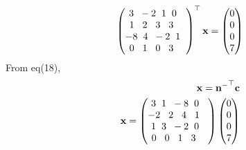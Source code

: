 \documentclass[10pt,a4paper]{report}
\newcommand{\myvec}[1]{\ensuremath{\begin{pmatrix}#1\end{pmatrix}}}
\let\vec\mathbf
\let\vec\mathbf
\begin{document}
\begin{multicols}{2}
\begin{align} 
	\myvec{3 \hspace{2mm} -2 \hspace{2mm} 1 \hspace{2mm} 0 \hspace{2mm}\\
	1 \hspace{3mm} 2 \hspace{3mm} 3 \hspace{3mm} 3 \hspace{3mm}\\
	-8 \hspace{2mm} 4 \hspace{2mm} -2 \hspace{2mm} 1 \hspace{2mm}\\
	0 \hspace{3mm} 1 \hspace{3mm} 0 \hspace{3mm} 3 \hspace{3mm}
	}^\top \vec{x} = \myvec{0\\0\\0\\7}
\end{align}
From eq(18),\\
\begin{align}
\vec{x} = \vec{n^-}^\top \vec{c}\\
\vec{x} = \myvec{3 \hspace{2mm} 1 \hspace{2mm} -8 \hspace{2mm} 0 \hspace{2mm}\\
	-2 \hspace{3mm} 2 \hspace{3mm} 4 \hspace{3mm} 1 \hspace{3mm}\\
	1 \hspace{2mm} 3 \hspace{2mm} -2 \hspace{2mm} 0 \hspace{2mm}\\
	0 \hspace{3mm} 0 \hspace{3mm} 1 \hspace{3mm} 3 \hspace{3mm}
	}\myvec{0\\0\\0\\7}

\end{align}
\end{multicols}
\end{document}

